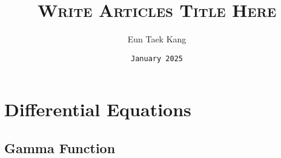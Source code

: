\documentclass{article}
\title{\textsc{Write Articles Title Here}}
\author{Eun Taek Kang}
\date{\texttt{January 2025}}
\begin{document}
\maketitle

\section{Differential Equations}

\subsection{Gamma Function}
\end{document}
